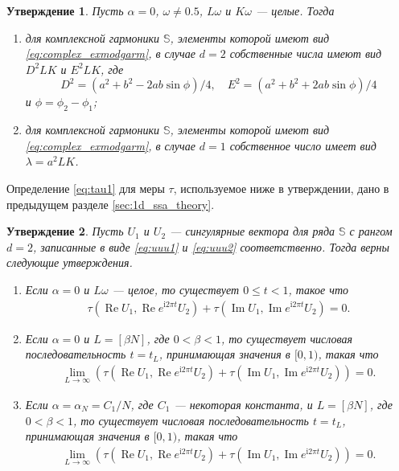 \documentclass[specialist,
               substylefile = spbu.rtx,
               subf,href,colorlinks=true, 12pt]{disser}
\def\RE{\mathop{\mathrm{Re}}}
\def\IM{\mathop{\mathrm{Im}}}
\newcommand{\I}{\mathrm{i}}
\newtheorem{Th}{Утверждение}
\begin{document}
\begin{Th} \cite[Предложение 2.3]{Golyandina.etal2003} \label{th:cssa_num}
Пусть $\alpha = 0$, $\omega \not = 0.5$, $L\omega$ и $K\omega$ --- целые. Тогда
\begin{enumerate}
\item для комплексной гармоники $\mathbb{S}$, элементы которой имеют вид \eqref{eq:complex_exmodgarm}, в случае $d=2$ собственные числа имеют вид  $D^2LK$ и $E^2LK$, где
\begin{equation*}
D^2=(a^2+b^2-2ab\sin\phi)/4, \quad E^2=(a^2+b^2+2ab\sin\phi)/4
\end{equation*}
и $\phi=\phi_2-\phi_1$;
\item для комплексной гармоники $\mathbb{S}$, элементы которой имеют вид \eqref{eq:complex_exmodgarm}, в случае $d=1$ собственное число имеет вид $\lambda=a^2LK$.
\end{enumerate}
\end{Th}

Определение \eqref{eq:tau1} для меры $\tau$, используемое ниже в утверждении, дано в предыдущем разделе \ref{sec:1d_ssa_theory}.
\begin{Th}   \cite[Теорема 2]{Zhornikova2016} \label{th:th_tau_cssa}
Пусть $U_1$ и $U_2$ --- сингулярные вектора для ряда $\mathbb{S}$ с рангом $d=2$, записанные в виде \eqref{eq:uuu1} и \eqref{eq:uuu2} соответственно. Тогда верны следующие утверждения.
\begin{enumerate}
\item \label{th:complex_t_1}
Если $\alpha=0$ и $L\omega$ --- целое, то существует $0 \leqslant t < 1$, такое что
\begin{gather*}
\tau(\RE U_1, \RE e^{\I 2\pi t} U_2) + \tau (\IM U_1, \IM e^{\I 2\pi t} U_2) = 0.
\end{gather*}
\item \label{th:complex_t_4}
Если $\alpha = 0$ и $L=[\beta N]$, где $0<\beta<1$, то существует числовая последовательность $t = t_L$, принимающая значения в $[0,1)$, такая что
\begin{gather*}
\lim_{L \rightarrow \infty} (\tau (\RE U_1, \RE e^{\I 2\pi t} U_2) + \tau (\IM U_1, \IM e^{\I 2\pi t} U_2)) = 0.
\end{gather*}
\item \label{th:complex_t_5}
Если $\alpha = \alpha_N = C_1/N$, где $C_1$ --- некоторая константа, и $L=[\beta N]$, где $0<\beta<1$, то существует числовая последовательность $t = t_L$, принимающая значения в $[0,1)$, такая что
\begin{gather*}
\lim_{L \rightarrow \infty} (\tau (\RE U_1, \RE e^{\I 2\pi t} U_2) + \tau (\IM U_1, \IM e^{\I 2\pi t} U_2)) = 0.
\end{gather*}
\end{enumerate}
\end{Th}
\end{document}
